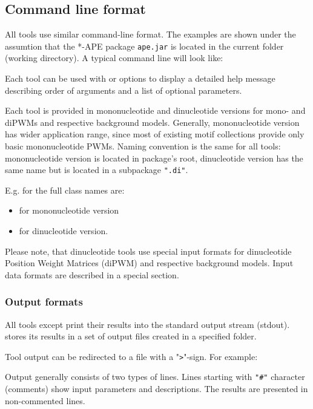 \subsection{Command line format}
All tools use similar command-line format. The examples are shown under the assumtion that the *-APE package \texttt{ape.jar} is located in the current folder (working directory). A typical command line will look like:\par
\texttt{}

Each tool can be used with  or  options to display a detailed help message describing order of arguments and a list of optional parameters.

Each tool is provided in mononucleotide and dinucleotide versions for mono- and diPWMs and respective background models.
Generally, mononucleotide version has wider application range, since most of existing motif collections provide only basic mononucleotide PWMs.
Naming convention is the same for all tools: mononucleotide version is located in package's root, dinucleotide version has the same name but is located in a subpackage \texttt{".di"}.

E.g. for  the full class names are:
\begin{itemize}
\item{} for mononucleotide version
\item{} for dinucleotide version.
\end{itemize}

Please note, that dinucleotide tools use special input formats for dinucleotide Position Weight Matrices (diPWM) and respective background models. Input data formats are described in a special section.


\subsubsection{Output formats}

All tools except  print their results into the standard output stream (stdout).
 stores its results in a set of output files created in a specified folder.

Tool output can be redirected to a file with a "\texttt{\textgreater}"-sign. For example:
\texttt{}

Output generally consists of two types of lines. Lines starting with \texttt{"\#"} character (comments) show
input parameters and descriptions. The results are presented in non-commented lines.
